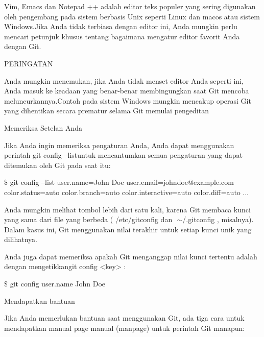 \noindent 
Vim, Emacs dan Notepad ++ adalah editor teks populer yang sering digunakan oleh pengembang pada sistem berbasis Unix seperti Linux dan macos atau sistem Windows.Jika Anda tidak terbiasa dengan editor ini, Anda mungkin perlu mencari petunjuk khusus tentang bagaimana mengatur editor favorit Anda dengan Git. \par
\vspace{12pt}
\noindent 
PERINGATAN \par
\vspace{12pt}
\noindent 
Anda mungkin menemukan, jika Anda tidak menset editor Anda seperti ini, Anda masuk ke keadaan yang benar-benar membingungkan saat Git mencoba meluncurkannya.Contoh pada sistem Windows mungkin mencakup operasi Git yang dihentikan secara prematur selama Git memulai pengeditan \par
\vspace{12pt}
\noindent 
Memeriksa Setelan Anda \par
\vspace{12pt}
\noindent 
Jika Anda ingin memeriksa pengaturan Anda, Anda dapat menggunakan perintah $  $git config --listuntuk mencantumkan semua pengaturan yang dapat ditemukan oleh Git pada saat itu: \par
\vspace{12pt}
\noindent 
  $  \$  $ git config --list user.name=John Doe user.email=johndoe@example.com color.status=auto color.branch=auto color.interactive=auto color.diff=auto ...  \par
\vspace{12pt}
\noindent 
Anda mungkin melihat tombol lebih dari satu kali, karena Git membaca kunci yang sama dari file yang berbeda ( $  $/etc/gitconfig $  $dan $  $ $  \sim  $/.gitconfig $  $, misalnya). $  $Dalam kasus ini, Git menggunakan nilai terakhir untuk setiap kunci unik yang dilihatnya. \par
\vspace{12pt}
\noindent 
Anda juga dapat memeriksa apakah Git menganggap nilai kunci tertentu adalah dengan mengetikkangit config <key> $  $: \par
\vspace{12pt}
\noindent 
  $  \$  $ git config user.name John Doe  \par
\vspace{12pt}
\noindent 
Mendapatkan bantuan \par
\vspace{12pt}
\noindent 
Jika Anda memerlukan bantuan saat menggunakan Git, ada tiga cara untuk mendapatkan manual page manual (manpage) untuk perintah Git manapun: \par
